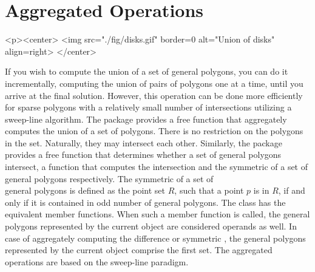 \section{Aggregated Operations}
\label{bso_sec:aggregated_ops}
\lcTex{%
  \setlength{\widthRight}{3.4cm}
  \setlength{\widthLeft}{\widthLineReal}
  \addtolength{\widthLeft}{-\widthRight}
  \begin{minipage}{\widthLeft}
}
\label{fig:disks}
\begin{ccHtmlOnly}
  <p><center>
    <img src="./fig/disks.gif" border=0 alt="Union of disks" align=right>
  </center>
\end{ccHtmlOnly}
If you wish to compute the union of a set of general polygons, you can
do it incrementally, computing the union of pairs of polygons one at a
time, until you arrive at the final solution. However, this operation
can be done more efficiently for sparse polygons with a relatively small
number of intersections utilizing a sweep-line algorithm. The package 
provides a free function that aggregately computes the union of a set of 
polygons. There is no restriction on the polygons in the set. Naturally, 
they may intersect each other. Similarly, the package provides a free 
function that determines whether a set of general polygons intersect, a 
function that computes the intersection and the symmetric
 of a set of general polygons
respectively. The symmetric  of a set of
\\
general polygons is defined as the point set $R$, such that a point
$p$ is in $R$, if and only if it is contained in odd number of 
general polygons. The class  has the equivalent 
member functions. When such a member function is called, the general 
polygons represented by the current object are considered operands as 
well. In case of aggregately computing the difference or symmetric
, the general polygons represented by
the current object comprise the first set. The aggregated operations
are based on the sweep-line paradigm. 


